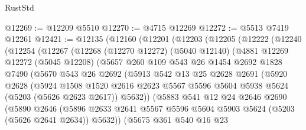\begin{lexlean}{RustStd}
\begin{coremodule}
@12269 := @12209 @5510
@12270 := @4715 @12269
@12272 := @5513 @7419 @12261
@12421 := @12135
    (@12160
      (@12201
        (@12203
          (@12205
            (@12222
              (@12240
                (@12254
                  (@12267
                    (@12268
                      (@12270 @12272)
                      (@5040 @12140)
                      (@4881
                        @12269
                        @12272
                        (@5045 @12208)
                        (@5657
                          @260
                          @109
                          @543
                          @26
                          @1454
                          @2692
                          @1828
                          @7490
                          (@5670
                            @543
                            @26
                            @2692
                            (@5913
                              @542
                              @13
                              @25
                              @2628
                              @2691
                              (@5920
                                @2628
                                (@5924
                                  @1508
                                  @1520
                                  @2616
                                  @2623
                                  @5567
                                  @5596
                                  @5604
                                  @5938
                                  @5624
                                  (@5203 (@5626 @2623 @2617))
                                  @5632))
                              (@5883
                                @541
                                @12
                                @24
                                @2646
                                @2690
                                (@5890
                                  @2646
                                  (@5896
                                    @2633
                                    @2641
                                    @5567
                                    @5596
                                    @5604
                                    @5903
                                    @5624
                                    (@5203 (@5626 @2641 @2634))
                                    @5632))
                                (@5675
                                  @361
                                  @540
                                  @16
                                  @23

\end{coremodule}
\end{lexlean}
